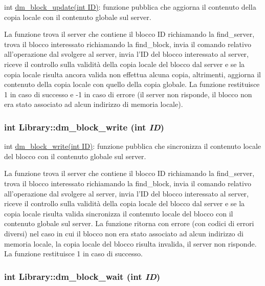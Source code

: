 int \hyperlink{classLibrary_1f541c7e1158ffb4d6d0f976dba29d71_1f541c7e1158ffb4d6d0f976dba29d71}{dm\_\-block\_\-update(int ID)}: funzione pubblica che aggiorna il contenuto della copia locale con il contenuto globale sul server. 

La funzione trova il server che contiene il blocco ID richiamando la find\_\-server, trova il blocco interessato richiamando la find\_\-block, invia il comando relativo all'operazione dal svolgere al server, invia l'ID del blocco interessato al server, riceve il controllo sulla validità della copia locale del blocco dal server e se la copia locale risulta ancora valida non effettua alcuna copia, altrimenti, aggiorna il contenuto della copia locale con quello della copia globale. La funzione restituisce 1 in caso di successo e -1 in caso di errore (il server non risponde, il blocco non era stato associato ad alcun indirizzo di memoria locale). \hypertarget{classLibrary_bea6b3730412c3716861261edd3bf670_bea6b3730412c3716861261edd3bf670}{
\subsubsection[{dm\_\-block\_\-write}]{\setlength{\rightskip}{0pt plus 5cm}int Library::dm\_\-block\_\-write (int {\em ID})}}
\label{classLibrary_bea6b3730412c3716861261edd3bf670_bea6b3730412c3716861261edd3bf670}


int \hyperlink{classLibrary_bea6b3730412c3716861261edd3bf670_bea6b3730412c3716861261edd3bf670}{dm\_\-block\_\-write(int ID)}: funzione pubblica che sincronizza il contenuto locale del blocco con il contenuto globale sul server. 

La funzione trova il server che contiene il blocco ID richiamando la find\_\-server, trova il blocco interessato richiamando la find\_\-block, invia il comando relativo all'operazione dal svolgere al server, invia l'ID del blocco interessato al server, riceve il controllo sulla validità della copia locale del blocco dal server e se la copia locale risulta valida sincronizza il contenuto locale del blocco con il contenuto globale sul server. La funzione ritorna con errore (con codici di errori diversi) nel caso in cui il blocco non era stato associato ad alcun indirizzo di memoria locale, la copia locale del blocco risulta invalida, il server non risponde. La funzione restituisce 1 in caso di successo. \hypertarget{classLibrary_467dc5e619aeb35ac8d5ac78b48dd450_467dc5e619aeb35ac8d5ac78b48dd450}{
\subsubsection[{dm\_\-block\_\-wait}]{\setlength{\rightskip}{0pt plus 5cm}int Library::dm\_\-block\_\-wait (int {\em ID})}}
\label{classLibrary_467dc5e619aeb35ac8d5ac78b48dd450_467dc5e619aeb35ac8d5ac78b48dd450}


